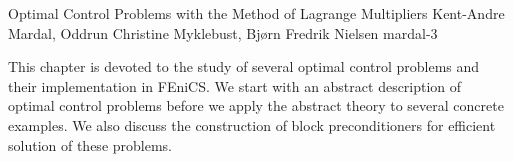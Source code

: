               {Optimal Control Problems with the Method of Lagrange Multipliers}
              {Kent-Andre Mardal, Oddrun Christine Myklebust, Bj\o{}rn Fredrik Nielsen}
              {mardal-3}

This chapter is devoted to the study of several optimal control
problems and their implementation in FEniCS. We start with an abstract
description of optimal control problems before we apply the abstract
theory to several concrete examples. We also discuss the construction
of block preconditioners for efficient solution of these problems.
